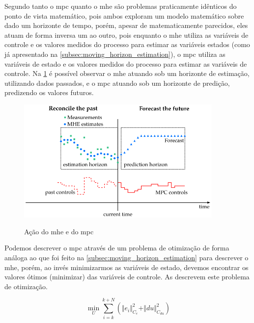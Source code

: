 Segundo  tanto o \acrshort{mpc} quanto o \acrshort{mhe} são problemas praticamente
idênticos do ponto de vista matemático, pois ambos exploram um modelo matemático sobre dado um horizonte de
tempo, porém, apesar de matematicamente parecidos, eles atuam de forma inversa um ao outro, pois
enquanto o \acrshort{mhe} utiliza as variáveis de controle e os valores medidos do processo para estimar
as variáveis estados (como já apresentado na \cref{subsec:moving_horizon_estimation}), o \acrshort{mpc}
utiliza as variáveis de estado e os valores medidos do processo para estimar as variáveis de controle.
Na \cref{fig:mhe_mpc} é possível observar o \acrshort{mhe} atuando sob um horizonte de estimação, utilizando
dados passados, e o \acrshort{mpc} atuando sob um horizonte de predição, predizendo os valores futuros.

\begin{figure}
    \caption{Ação do \acrlong{mhe} e do \acrlong{mpc}}
	\begin{center}
		\includegraphics[width=0.9\textwidth]{./5_images/fig_mhe_mpc.png} 
		\label{fig:mhe_mpc}
	\end{center}
    \centering
\end{figure}

Podemos descrever o \acrshort{mpc} através de um problema de otimização de forma análoga ao que foi feito
na \cref{subsec:moving_horizon_estimation} para descrever o \acrshort{mhe}, porém, ao invés minimizarmos
as variáveis de estado, devemos encontrar os valores ótimos (minimizar) das variáveis de controle.
As  descrevem este problema de otimização.

\begin{equation}
	\label{eq:mpc_minimization}
	\min_{U} \sum_{i=k}^{k+N} ( \Vert e_i \Vert^2_{C_e} + \Vert du \Vert^2_{C_{du}} )
\end{equation}

